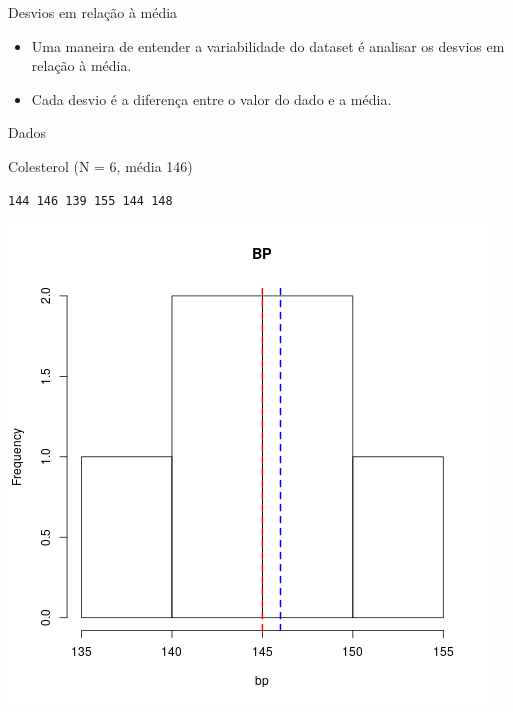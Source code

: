 \documentclass{beamer}
\begin{document}
\begin{frame}{\scriptsize Desvios em relação à média}
  \begin{itemize}
    \footnotesize
  \item Uma maneira de entender a variabilidade do dataset é analisar
    os desvios em relação à média.
    \bigskip
  \item Cada desvio é a diferença entre o valor do dado e a média.
  \end{itemize}
\end{frame}

\begin{frame}[fragile]{\scriptsize Dados}
  \begin{exampleblock}{\scriptsize Colesterol (N = 6, média 146)}
    \begin{center}
    \tiny
\begin{verbatim}
144 146 139 155 144 148
\end{verbatim}
    \bigskip
    \includegraphics[height=.5\textheight]{Cap3/histograma-bp}
  \end{center}
\end{exampleblock}
\end{frame}
\end{document}

